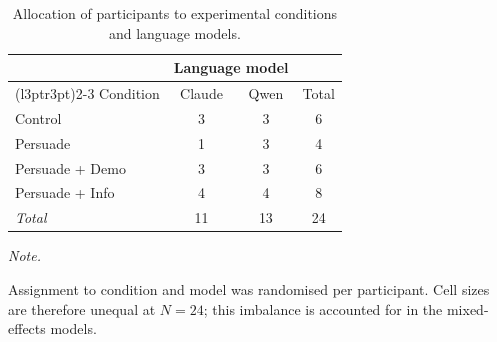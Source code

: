 \begin{table}[!h]
\centering
\caption{\label{tab:design_balance}Allocation of participants to experimental conditions and language models.}
\centering
\fontsize{10}{12}\selectfont
\begin{threeparttable}
\begin{tabular}[t]{lccc}
\toprule
\multicolumn{1}{c}{ } & \multicolumn{2}{c}{Language model} & \multicolumn{1}{c}{ } \\
\cmidrule(l{3pt}r{3pt}){2-3}
Condition & Claude & Qwen & Total\\
\midrule
Control & 3 & 3 & 6\\
Persuade & 1 & 3 & 4\\
Persuade + Demo & 3 & 3 & 6\\
Persuade + Info & 4 & 4 & 8\\
\midrule
\textit{Total} & 11 & 13 & 24\\
\bottomrule
\end{tabular}
\begin{tablenotes}
\item \textit{Note.} 
\item Assignment to condition and model was randomised per participant. Cell sizes are therefore unequal at $N = 24$; this imbalance is accounted for in the mixed-effects models.
\end{tablenotes}
\end{threeparttable}
\end{table}
